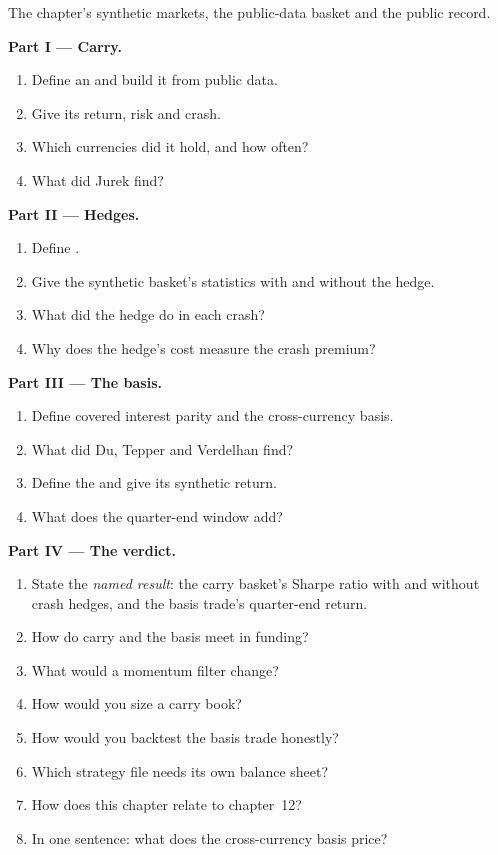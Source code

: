 \begin{problem}\label{pb:s2:cross-currency-basis-and-fx-carry:1}
The chapter's synthetic markets, the public-data basket and the public record.

\medskip\noindent\textbf{Part I --- Carry.}
\begin{enumerate}
\item Define an  and build it from public data.
\item Give its return, risk and crash.
\item Which currencies did it hold, and how often?
\item What did Jurek find?
\end{enumerate}

\medskip\noindent\textbf{Part II --- Hedges.}
\begin{enumerate}[resume]
\item Define .
\item Give the synthetic basket's statistics with and without the hedge.
\item What did the hedge do in each crash?
\item Why does the hedge's cost measure the crash premium?
\end{enumerate}

\medskip\noindent\textbf{Part III --- The basis.}
\begin{enumerate}[resume]
\item Define covered interest parity and the cross-currency basis.
\item What did Du, Tepper and Verdelhan find?
\item Define the  and give its synthetic return.
\item What does the quarter-end window add?
\end{enumerate}

\medskip\noindent\textbf{Part IV --- The verdict.}
\begin{enumerate}[resume]
\item State the \emph{named result}: the carry basket's Sharpe ratio with and without crash hedges, and the basis trade's quarter-end return.
\item How do carry and the basis meet in funding?
\item What would a momentum filter change?
\item How would you size a carry book?
\item How would you backtest the basis trade honestly?
\item Which strategy file needs its own balance sheet?
\item How does this chapter relate to chapter~12?
\item In one sentence: what does the cross-currency basis price?
\end{enumerate}
\end{problem}

